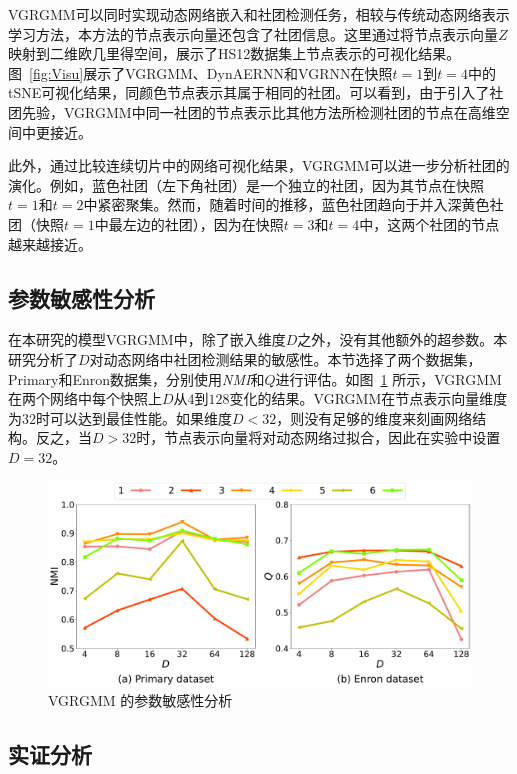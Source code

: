 VGRGMM可以同时实现动态网络嵌入和社团检测任务，相较与传统动态网络表示学习方法，本方法的节点表示向量还包含了社团信息。这里通过将节点表示向量$Z$映射到二维欧几里得空间，展示了HS12数据集上节点表示的可视化结果。图~\ref{fig:Visu}展示了VGRGMM、DynAERNN和VGRNN在快照$t=1$到$t=4$中的tSNE可视化结果，同颜色节点表示其属于相同的社团。可以看到，由于引入了社团先验，VGRGMM中同一社团的节点表示比其他方法所检测社团的节点在高维空间中更接近。

此外，通过比较连续切片中的网络可视化结果，VGRGMM可以进一步分析社团的演化。例如，蓝色社团（左下角社团）是一个独立的社团，因为其节点在快照$t=1$和$t=2$中紧密聚集。然而，随着时间的推移，蓝色社团趋向于并入深黄色社团（快照$t=1$中最左边的社团），因为在快照$t=3$和$t=4$中，这两个社团的节点越来越接近。


\subsection{参数敏感性分析}




在本研究的模型VGRGMM中，除了嵌入维度$D$之外，没有其他额外的超参数。本研究分析了$D$对动态网络中社团检测结果的敏感性。本节选择了两个数据集，Primary和Enron数据集，分别使用\emph{NMI}和$Q$进行评估。如图~\ref{fig:Hyper} 所示，VGRGMM在两个网络中每个快照上$D$从$4$到$128$变化的结果。VGRGMM在节点表示向量维度为$32$时可以达到最佳性能。如果维度$D < 32$，则没有足够的维度来刻画网络结构。反之，当$D > 32$时，节点表示向量将对动态网络过拟合，因此在实验中设置$D = 32$。

\begin{figure}[htbp]
	\centering
	\includegraphics[width=.7\textwidth]{figures/chap06/DimensionsOndifferentData-t.pdf}
	\caption{VGRGMM 的参数敏感性分析}
	\label{fig:Hyper}
	\vspace{0cm}
\end{figure}




\subsection{实证分析}


